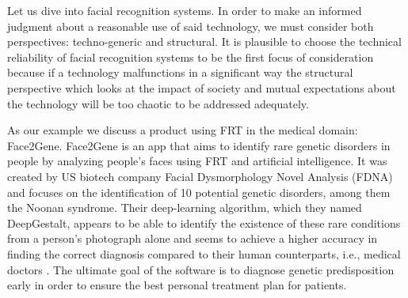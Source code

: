 \documentclass[manuscript,screen]{acmart}
\begin{document}
Let us dive into facial recognition systems. In order to make an informed judgment about a reasonable use of said technology, we must consider both perspectives: techno-generic and structural. It is plausible to choose the technical reliability of facial recognition systems to be the first focus of consideration because if a technology malfunctions in a significant way the structural perspective which looks at the impact of society and mutual expectations about the technology will be too chaotic to be addressed adequately. 

As our example we discuss a product using FRT in the medical domain: Face2Gene. Face2Gene is an app that aims to identify rare genetic disorders in people by analyzing people’s faces using FRT and artificial intelligence. It was created by US biotech company Facial Dysmorphology Novel Analysis (FDNA) and focuses on the identification of 10 potential genetic disorders, among them the Noonan syndrome. Their deep-learning algorithm, which they named DeepGestalt, appears to be able to identify the existence of these rare conditions from a person’s photograph alone and seems to achieve a higher accuracy in finding the correct diagnosis compared to their human counterparts, i.e., medical doctors \citep{gurovich2019identifying}. The ultimate goal of the software is to diagnose genetic predisposition early in order to ensure the best personal treatment plan for patients. 
\end{document}
